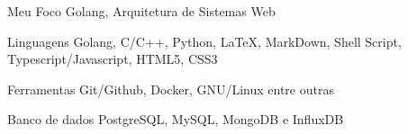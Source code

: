 
\begin{cvskills}
  \cvskill
  {Meu Foco}
  {Golang, Arquitetura de Sistemas Web}

  \cvskill
  {Linguagens}
  {Golang, C/C++, Python, LaTeX, MarkDown, Shell Script, Typescript/Javascript, HTML5, CSS3}

  \cvskill
  {Ferramentas}
  {Git/Github, Docker, GNU/Linux entre outras }

  \cvskill
  {Banco de dados}
  {PostgreSQL, MySQL, MongoDB e InfluxDB}


\end{cvskills}
